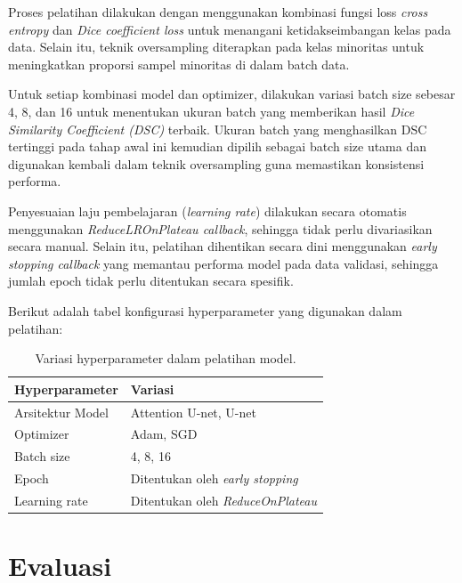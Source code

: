 Proses pelatihan dilakukan dengan menggunakan kombinasi fungsi loss \textit{cross entropy} dan \textit{Dice coefficient loss} untuk menangani ketidakseimbangan kelas pada data. Selain itu, teknik oversampling diterapkan pada kelas minoritas untuk meningkatkan proporsi sampel minoritas di dalam batch data.

Untuk setiap kombinasi model dan optimizer, dilakukan variasi batch size sebesar 4, 8, dan 16 untuk menentukan ukuran batch yang memberikan hasil \textit{Dice Similarity Coefficient (DSC)} terbaik. Ukuran batch yang menghasilkan DSC tertinggi pada tahap awal ini kemudian dipilih sebagai batch size utama dan digunakan kembali dalam teknik oversampling guna memastikan konsistensi performa.

Penyesuaian laju pembelajaran (\textit{learning rate}) dilakukan secara otomatis menggunakan \textit{ReduceLROnPlateau callback}, sehingga tidak perlu divariasikan secara manual. Selain itu, pelatihan dihentikan secara dini menggunakan \textit{early stopping callback} yang memantau performa model pada data validasi, sehingga jumlah epoch tidak perlu ditentukan secara spesifik.

Berikut adalah tabel konfigurasi hyperparameter yang digunakan dalam pelatihan:

\begin{table}[h]
	\centering
	\caption{Variasi hyperparameter dalam pelatihan model.}
	\label{tab:hyperparameter}
	\begin{tabular}{lllll}
		\hline
		\textbf{Hyperparameter} & \multicolumn{4}{l}{\textbf{Variasi}}                  \\ \hline
		Arsitektur Model        & \multicolumn{4}{l}{Attention U-net, U-net}            \\
		Optimizer               & \multicolumn{4}{l}{Adam, SGD}                         \\
		Batch size              & \multicolumn{4}{l}{4, 8, 16}                          \\
		Epoch                  & \multicolumn{4}{l}{Ditentukan oleh \textit{early stopping}}    \\
		Learning rate           & \multicolumn{4}{l}{Ditentukan oleh \textit{ReduceOnPlateau}} \\ \hline
	\end{tabular}
\end{table}


\section{Evaluasi}

